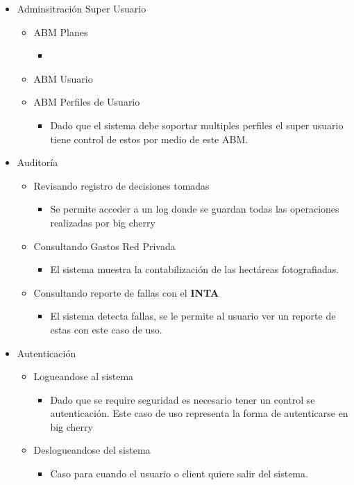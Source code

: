 \begin{itemize}
 \item Adminsitraci\'on Super Usuario
 \begin{itemize}
    \item ABM Planes
    \begin{itemize}
	\item
    \end{itemize}
    \item ABM Usuario
    \item ABM Perfiles de Usuario
    \begin{itemize}
	\item Dado que el sistema debe soportar multiples perfiles el super usuario tiene control de estos por medio de este ABM.
    \end{itemize}
 \end{itemize}
 
 \item Auditor\'ia
 \begin{itemize}
    \item Revisando registro de decisiones tomadas
    \begin{itemize}
	\item Se permite acceder a un log donde se guardan todas las operaciones realizadas por big cherry
    \end{itemize}
    \item Consultando Gastos Red Privada
    \begin{itemize}
     \item El sistema muestra la contabilizaci\'on de las hect\'areas fotografiadas.
    \end{itemize}
    \item Consultando reporte de fallas con el \textbf{INTA}
    \begin{itemize}
     \item El sistema detecta fallas, se le permite al usuario ver un reporte de estas con este caso de uso.
    \end{itemize}

 \end{itemize}
 \item Autenticaci\'on
 \begin{itemize}
    \item Logueandose al sistema
    \begin{itemize}
      \item Dado que se require seguridad es necesario tener un control se autenticaci\'on. Este caso de uso representa la forma de autenticarse en big cherry
    \end{itemize}
    \item Deslogueandose del sistema
    \begin{itemize}
      \item Caso para cuando el usuario o client quiere salir del sistema.
    \end{itemize}
 \end{itemize}
\end{itemize}
